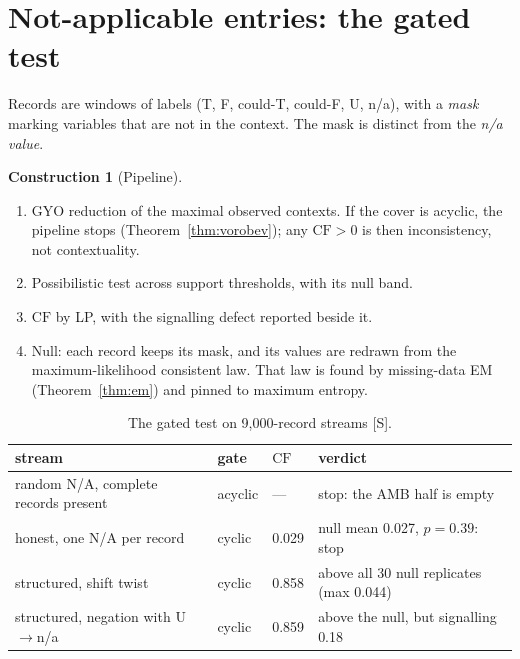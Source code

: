 \documentclass[11pt]{article}
\theoremstyle{definition}
\newtheorem{construction}[theorem]{Construction}
\theoremstyle{remark}
\newcommand{\CF}{\mathrm{CF}}
\newcommand{\src}[1]{\textsf{\small[#1]}}
\begin{document}
\section{Not-applicable entries: the gated test}\label{sec:na}
Records are windows of labels (T, F, could-T, could-F, U, n/a), with a \emph{mask} marking variables that are not in the context. The mask is distinct from the \emph{n/a value}.

\begin{construction}[Pipeline]
\begin{enumerate}
  \item GYO reduction of the maximal observed contexts. If the cover is acyclic, the pipeline stops (Theorem~\ref{thm:vorobev}); any $\CF>0$ is then inconsistency, not contextuality.
  \item Possibilistic test across support thresholds, with its null band.
  \item $\CF$ by LP, with the signalling defect reported beside it.
  \item Null: each record keeps its mask, and its values are redrawn from the maximum-likelihood consistent law. That law is found by missing-data EM (Theorem~\ref{thm:em}) and pinned to maximum entropy.
\end{enumerate}
\end{construction}
\begin{table}[h]\centering\small
\begin{tabular}{llll}
\toprule
stream & gate & $\CF$ & verdict\\
\midrule
random N/A, complete records present & acyclic & --- & stop: the AMB half is empty\\
honest, one N/A per record & cyclic & 0.029 & null mean 0.027, $p=0.39$: stop\\
structured, shift twist & cyclic & 0.858 & above all 30 null replicates (max 0.044)\\
structured, negation with U$\to$n/a & cyclic & 0.859 & above the null, but signalling 0.18\\
\bottomrule
\end{tabular}
\caption{The gated test on 9{,}000-record streams \src{S}.}
\end{table}
\end{document}
